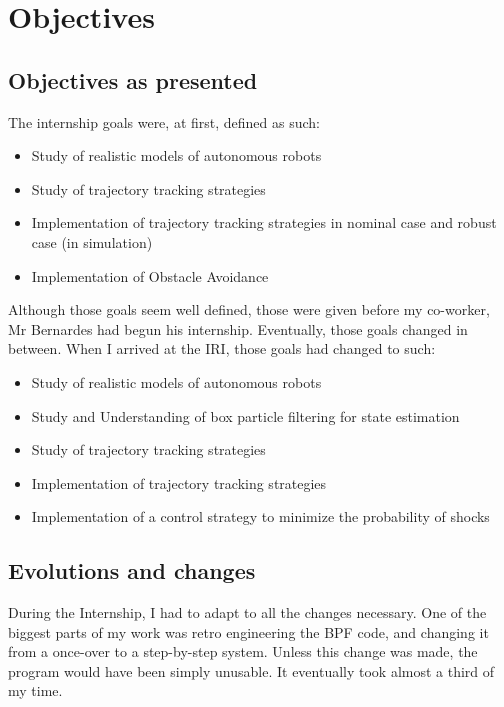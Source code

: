 \chapter{Objectives}

\label{theme}


\section{Objectives as presented}

The internship goals were, at first, defined as such:
\begin{itemize}
  \item Study of realistic models of autonomous robots
  \item Study of trajectory tracking strategies
  \item Implementation of trajectory tracking strategies in nominal case and robust case (in simulation)
  \item Implementation of Obstacle Avoidance
\end{itemize}

Although those goals seem well defined, those were given before my co-worker, Mr Bernardes had begun his internship.
Eventually, those goals changed in between.
When I arrived at the IRI, those goals had changed to such:

\begin{itemize}
  \item Study of realistic models of autonomous robots
  \item Study and Understanding of box particle filtering for state estimation
  \item Study of trajectory tracking strategies
  \item Implementation of trajectory tracking strategies
  \item Implementation of a control strategy to minimize the probability of shocks
\end{itemize}

\section{Evolutions and changes}

During the Internship, I had to adapt to all the changes necessary.
One of the biggest parts of my work was retro engineering the BPF code, and changing it from a once-over to a step-by-step system.
Unless this change was made, the program would have been simply unusable. It eventually took almost a third of my time.\\


